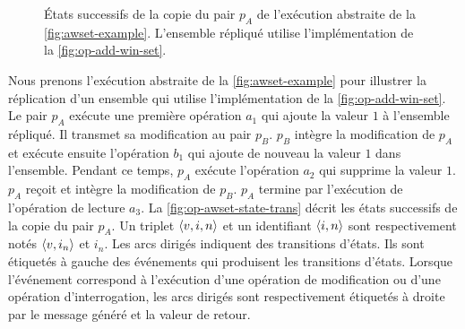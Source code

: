 \begin{figure}[bth]
\centering
{}
\caption{États successifs de la copie du pair $p_A$ de l'exécution abstraite de la \autoref{fig:awset-example}.
L'ensemble répliqué utilise l'implémentation de la \autoref{fig:op-add-win-set}.}\label{fig:op-awset-state-trans}
\end{figure}

Nous prenons l'exécution abstraite de la \autoref{fig:awset-example} pour illustrer la réplication d'un ensemble qui utilise l'implémentation de la \autoref{fig:op-add-win-set}.
Le pair $p_A$ exécute une première opération $a_1$ qui ajoute la valeur $1$ à l'ensemble répliqué.
Il transmet sa modification au pair $p_B$.
$p_B$ intègre la modification de $p_A$ et exécute ensuite l'opération $b_1$ qui ajoute de nouveau la valeur $1$ dans l'ensemble.
Pendant ce temps, $p_A$ exécute l'opération $a_2$ qui supprime la valeur $1$.
$p_A$ reçoit et intègre la modification de $p_B$.
$p_A$ termine par l'exécution de l'opération de lecture $a_3$.
La \autoref{fig:op-awset-state-trans} décrit les états successifs de la copie du pair $p_A$.
Un triplet $\tuple*{v, i, n}$ et un identifiant $\tuple*{i, n}$ sont respectivement notés $\tuple*{v, i_n}$ et $i_n$.
Les arcs dirigés indiquent des transitions d'états.
Ils sont étiquetés à gauche des événements qui produisent les transitions d'états.
Lorsque l'événement correspond à l'exécution d'une opération de modification ou d'une opération d'interrogation, les arcs dirigés sont respectivement étiquetés à droite par le message généré et la valeur de retour.

